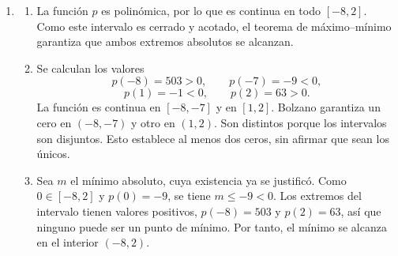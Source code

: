 \documentclass[10pt,a5paper]{article}
\begin{document}
\begin{solucion}[de la versión 1]
\begin{enumerate}
  \item
  \begin{enumerate}
    \item La función $p$ es polinómica, por lo que es continua en todo $[-8,2]$. Como este intervalo es cerrado y acotado, el teorema de máximo--mínimo garantiza que ambos extremos absolutos se alcanzan.
    \item Se calculan los valores
    \[
      p(-8)=503>0,\qquad p(-7)=-9<0,
    \]
    \[
      p(1)=-1<0,\qquad p(2)=63>0.
    \]
    La función es continua en $[-8,-7]$ y en $[1,2]$. Bolzano garantiza un cero en $(-8,-7)$ y otro en $(1,2)$. Son distintos porque los intervalos son disjuntos. Esto establece al menos dos ceros, sin afirmar que sean los únicos.
    \item Sea $m$ el mínimo absoluto, cuya existencia ya se justificó. Como $0\in[-8,2]$ y $p(0)=-9$, se tiene $m\leq-9<0$. Los extremos del intervalo tienen valores positivos, $p(-8)=503$ y $p(2)=63$, así que ninguno puede ser un punto de mínimo. Por tanto, el mínimo se alcanza en el interior $(-8,2)$.
  \end{enumerate}

\end{enumerate}
\end{solucion}
\fi
\end{document}
